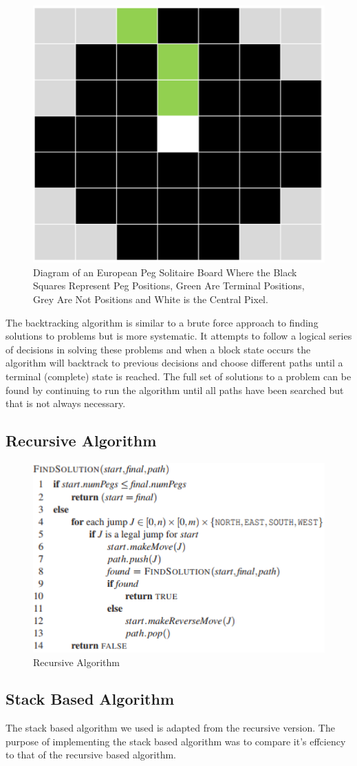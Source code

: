\documentclass[a4paper]{article}
\begin{document}
\begin{figure}[H]
	\centering
	\label{board}
	\includegraphics[width=.50\textwidth,scale=.50]{images/board}
	\caption{Diagram of an European Peg Solitaire Board Where the
				Black Squares Represent Peg Positions,
				Green Are Terminal Positions,
				Grey Are Not Positions and
				White is the Central Pixel.
			}
\end{figure}


\noindent The backtracking algorithm is similar to a brute force approach to finding solutions to problems but is more systematic. It attempts to follow a logical series of decisions in solving these problems and when a block state occurs the algorithm will backtrack to previous decisions and choose different paths until a terminal (complete) state is reached. The full set of solutions to a problem can be found by continuing to run the algorithm until all paths have been searched but that is not always necessary.

\subsection{Recursive Algorithm}
\begin{figure}[H]
	\centering
	\includegraphics[width=.50\textwidth,scale=.50]{images/recursive_algorithm}
	\caption{Recursive Algorithm \cite{lab5}}
\end{figure}

\subsection{Stack Based Algorithm}
The stack based algorithm we used is adapted from the recursive version. The purpose of implementing the stack based algorithm was to compare it's effciency to that of the recursive based algorithm.
\end{document}
